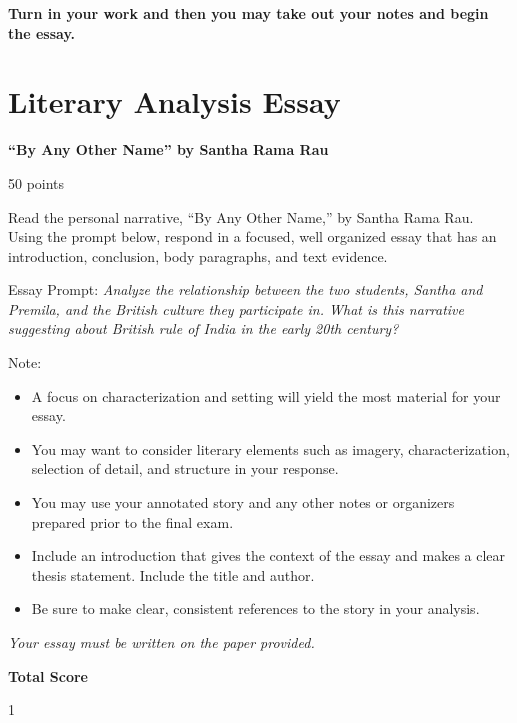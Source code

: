 \documentclass[11pt]{article}
\begin{document}
\vfill

\begin{center}
\textbf{Turn in your work and then you may take out your notes and
  begin the essay.}
\end{center}

\newpage
\section{Literary Analysis Essay}
\label{sec:orgf9f34cb}
\textbf{``By Any Other Name'' by Santha Rama Rau}
\vspace{1em}

50 points
\vspace{1em}

Read the personal narrative, ``By Any Other Name,'' by Santha Rama
Rau. Using the prompt below, respond in a focused, well organized
essay that has an introduction, conclusion, body paragraphs, and text
evidence.

\vspace{1em}
Essay Prompt: \emph{Analyze the relationship between the two students,
  Santha and Premila, and the British culture they participate
  in. What is this narrative suggesting about British rule of India in
  the early 20th century?}
\vspace{1em}

Note:
\begin{itemize}
\item A focus on characterization and setting will yield the most
  material for your essay.
\item You may want to consider literary elements such as imagery,
  characterization, selection of detail, and structure in your
  response.
\item You may use your annotated story and any other notes or
  organizers prepared prior to the final exam.
\item Include an introduction that gives the context of the essay and
  makes a clear thesis statement. Include the title and author.
\item Be sure to make clear, consistent references to the story in your analysis.
\end{itemize}

\emph{Your essay must be written on the paper provided.}

\vfill

\textbf{Total Score}\hline

\newpage

1\hline
\vfill
\end{document}
